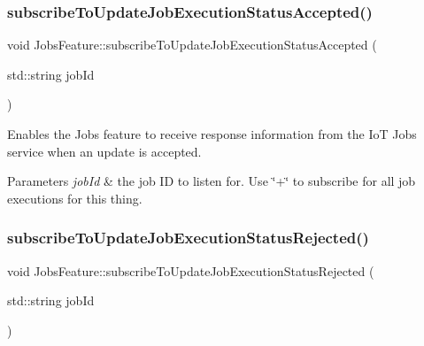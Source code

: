 \subsubsection{\texorpdfstring{subscribe\+To\+Update\+Job\+Execution\+Status\+Accepted()}{subscribeToUpdateJobExecutionStatusAccepted()}}
{\footnotesize\ttfamily void Jobs\+Feature\+::subscribe\+To\+Update\+Job\+Execution\+Status\+Accepted (\begin{DoxyParamCaption}\item[{std\+::string}]{job\+Id }\end{DoxyParamCaption})\hspace{0.3cm}{\ttfamily [private]}}



Enables the Jobs feature to receive response information from the IoT Jobs service when an update is accepted. 


\begin{DoxyParams}{Parameters}
{\em job\+Id} & the job ID to listen for. Use \char`\"{}+\char`\"{} to subscribe for all job executions for this thing. \\
\hline
\end{DoxyParams}
\mbox{\label{class_aws_1_1_iot_1_1_device_client_1_1_jobs_1_1_jobs_feature_a2769b90aae519400c54300cca7d0719c}} 
\subsubsection{\texorpdfstring{subscribe\+To\+Update\+Job\+Execution\+Status\+Rejected()}{subscribeToUpdateJobExecutionStatusRejected()}}
{\footnotesize\ttfamily void Jobs\+Feature\+::subscribe\+To\+Update\+Job\+Execution\+Status\+Rejected (\begin{DoxyParamCaption}\item[{std\+::string}]{job\+Id }\end{DoxyParamCaption})\hspace{0.3cm}{\ttfamily [private]}}



